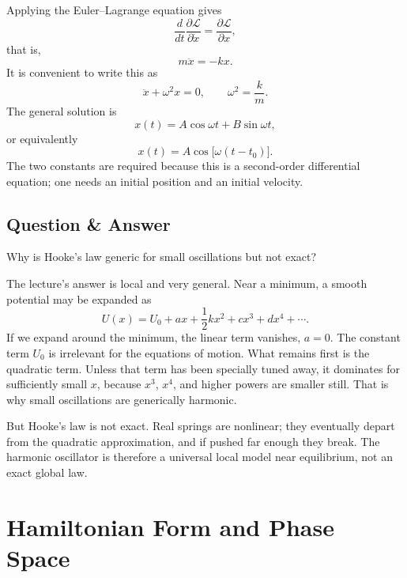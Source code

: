 Applying the Euler--Lagrange equation gives
\begin{equation}
\frac{d}{dt}\frac{\partial\mathcal{L}}{\partial\dot x}
=
\frac{\partial\mathcal{L}}{\partial x},
\end{equation}
that is,
\begin{equation}
m\ddot x=-kx.
\end{equation}
It is convenient to write this as
\begin{equation}
\ddot x+\omega^2 x=0,
\qquad
\omega^2=\frac{k}{m}.
\end{equation}
The general solution is
\begin{equation}
x(t)=A\cos\omega t+B\sin\omega t,
\end{equation}
or equivalently
\begin{equation}
x(t)=A\cos\bigl[\omega(t-t_0)\bigr].
\end{equation}
The two constants are required because this is a second-order differential equation; one needs an initial position and an initial velocity.

\subsection{Question \& Answer}

Why is Hooke's law generic for small oscillations but not exact?

The lecture's answer is local and very general. Near a minimum, a smooth potential may be expanded as
\begin{equation}
U(x)=U_0+ax+\frac12 kx^2+cx^3+dx^4+\cdots.
\end{equation}
If we expand around the minimum, the linear term vanishes, \(a=0\). The constant term \(U_0\) is irrelevant for the equations of motion. What remains first is the quadratic term. Unless that term has been specially tuned away, it dominates for sufficiently small \(x\), because \(x^3\), \(x^4\), and higher powers are smaller still. That is why small oscillations are generically harmonic.

But Hooke's law is not exact. Real springs are nonlinear; they eventually depart from the quadratic approximation, and if pushed far enough they break. The harmonic oscillator is therefore a universal local model near equilibrium, not an exact global law.

\section{Hamiltonian Form and Phase Space}

